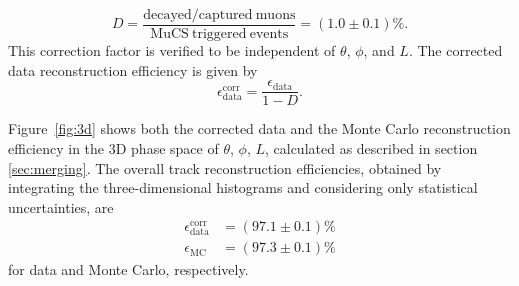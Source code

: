 \documentclass[a4paper,11pt]{article}
\begin{document}
\begin{equation}
D = \frac{\mathrm{decayed/captured~muons}}{\mathrm{MuCS~triggered~events}} = (1.0 \pm 0.1)\%.
\end{equation}
This correction factor is verified to be independent of $\theta$, $\phi$, and $L$. The corrected data reconstruction efficiency is given by
\begin{equation}\label{eq:dcorr}
\epsilon_{\mathrm{data}}^{\mathrm{corr}} =  \frac{\epsilon_{\mathrm{data}}}{1-D}.
\end{equation}

Figure~\ref{fig:3d} shows both the corrected data and the Monte Carlo reconstruction efficiency in the 3D phase space of $\theta$, $\phi$, $L$, calculated as described in section \ref{sec:merging}. The overall track reconstruction efficiencies, obtained by integrating the three-dimensional histograms and considering only statistical uncertainties, are
\begin{align}
\epsilon_{\mathrm{data}}^{\mathrm{corr}} &= (97.1 \pm 0.1)\%\\
\epsilon_{\mathrm{MC}} &= (97.3 \pm 0.1)\% \nonumber
\end{align}
for data and Monte Carlo, respectively.
\end{document}
